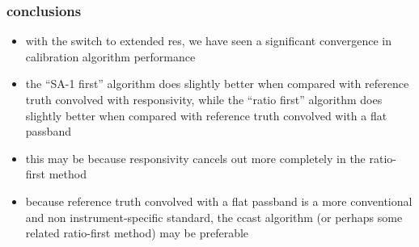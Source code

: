 \documentclass[11pt]{beamer}
\begin{document}
\begin{frame}
\frametitle{conclusions}

\begin{itemize}

  \item with the switch to extended res, we have seen a significant
    convergence in calibration algorithm performance 


  \item the {\noaa} ``SA-1 first'' algorithm does slightly better
    when compared with reference truth convolved with responsivity,
    while the {\ccast} ``ratio first'' algorithm does slightly
    better when compared with reference truth convolved with a flat
    passband

  \item this may be because responsivity cancels out more completely
    in the ratio-first method

  \item because reference truth convolved with a flat passband is
    a more conventional and non instrument-specific standard, the
    ccast algorithm (or perhaps some related ratio-first method) may
    be preferable

\end{itemize}

\end{frame}
\end{document}
